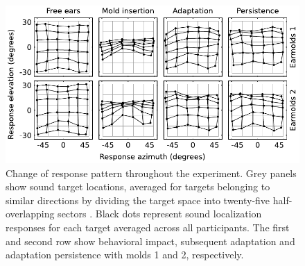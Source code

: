  \begin{figure}[h]
	\includegraphics[width=14cm, center]{../Results/figures/fig7/fig7}
	\caption{Change of response pattern throughout the experiment. Grey panels show sound target locations, averaged for targets belonging to similar directions by dividing the target space into twenty-five half-overlapping sectors \citep{hofman_relearning_1998}. Black dots represent sound localization responses for each target averaged across all participants. The first and second row show behavioral impact, subsequent adaptation and adaptation persistence with molds 1 and 2, respectively.}
        \label{fig:response_evo}
\end{figure}

